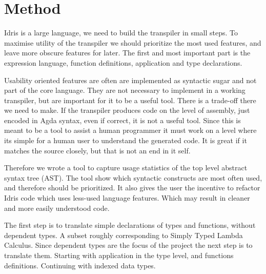\documentclass[parskip=half]{scrartcl}
\begin{document}
\section{Method}
Idris is a large language, we need to build the transpiler in small steps. To
maximise utility of the transpiler we should prioritize the most used features,
and leave more obscure features for later. The first and most important part is
the expression language, function definitions, application and type
declarations.

Usability oriented features are often are implemented as syntactic sugar and
not part of the core language. They are not necessary to implement in a working
transpiler, but are important for it to be a useful tool. There is a trade-off
there we need to make. If the transpiler produces code on the level of
assembly, just encoded in Agda syntax, even if correct, it is not a useful
tool. Since this is meant to be a tool to assist a human programmer it must
work on a level where its simple for a human user to understand the generated
code. It is great if it matches the source closely, but that is not an end in
it self.


Therefore we wrote a tool to capture usage statistics of the top level abstract
syntax tree (AST). The tool show which syntactic constructs are most often
used, and therefore should be prioritized. It also gives the user the
incentive to refactor Idris code which uses less-used language features.
Which may result in cleaner and more easily understood code.

The first step is to translate simple declarations of types and functions,
without dependent types. A subset roughly corresponding to Simply Typed Lambda
Calculus. Since dependent types are the focus of the project the next step is
to translate them. Starting with application in the type level, and functions
definitions. Continuing with indexed data types.




\end{document}

